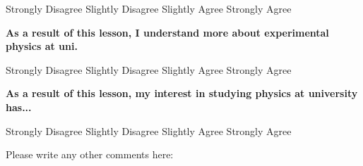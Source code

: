 \vspace{3mm}
Strongly Disagree\hspace{1.5cm}	Slightly Disagree\hspace{1.5cm}	Slightly Agree\hspace{1.5cm}		Strongly Agree
\vspace{3mm}

\noindent \textbf{As a result of this lesson, I understand more about experimental physics at uni.}

\vspace{3mm}
Strongly Disagree\hspace{1.5cm}	Slightly Disagree\hspace{1.5cm}	Slightly Agree\hspace{1.5cm}		Strongly Agree
\vspace{3mm}

\noindent \textbf{As a result of this lesson, my interest in studying physics at university has...}

\vspace{3mm}
Strongly Disagree\hspace{1.5cm}	Slightly Disagree\hspace{1.5cm}	Slightly Agree\hspace{1.5cm}		Strongly Agree
\vspace{3mm}

\noindent Please write any other comments here:








